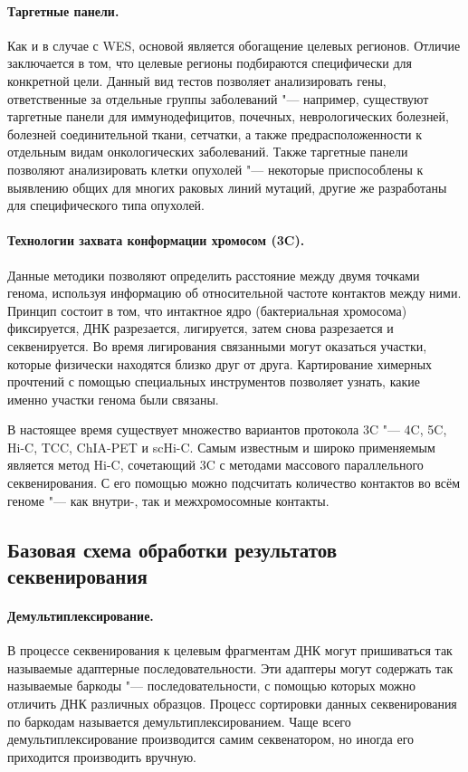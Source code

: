 \documentclass[a4paper,12pt]{article}
\begin{document}
\paragraph{Таргетные панели.}
Как и в случае с WES, основой является обогащение целевых регионов.
Отличие заключается в том, что целевые регионы подбираются специфически для конкретной цели.
Данный вид тестов позволяет анализировать гены, ответственные за отдельные группы заболеваний "--- например, существуют таргетные панели для иммунодефицитов, почечных, неврологических болезней, болезней соединительной ткани, сетчатки, а также предрасположенности к отдельным видам онкологических заболеваний.
Также таргетные панели позволяют анализировать клетки опухолей "--- некоторые приспособлены к выявлению общих для многих раковых линий мутаций, другие же разработаны для специфического типа опухолей\cite{yohe}.

\paragraph{Технологии захвата конформации хромосом (3C).}
Данные методики позволяют определить расстояние между двумя точками генома, используя информацию об относительной частоте контактов между ними.
Принцип состоит в том, что интактное ядро (бактериальная хромосома) фиксируется, ДНК разрезается, лигируется, затем снова разрезается и секвенируется.
Во время лигирования связанными могут оказаться участки, которые физически находятся близко друг от друга.
Картирование химерных прочтений с помощью специальных инструментов позволяет узнать, какие именно участки генома были связаны\cite{dekker}.

В настоящее время существует множество вариантов протокола 3C "--- 4C, 5C, Hi-C, TCC, ChIA-PET и scHi-C.
Самым известным и широко применяемым является метод Hi-C, сочетающий 3C с методами массового параллельного секвенирования.
С его помощью можно подсчитать количество контактов во всём геноме "--- как внутри-, так и межхромосомные контакты\cite{oluwadare}.

\subsection{Базовая схема обработки результатов секвенирования}

\paragraph{Демультиплексирование.}
В процессе секвенирования к целевым фрагментам ДНК могут пришиваться так называемые адаптерные последовательности.
Эти адаптеры могут содержать так называемые баркоды "--- последовательности, с помощью которых можно отличить ДНК различных образцов.
Процесс сортировки данных секвенирования по баркодам называется демультиплексированием.
Чаще всего демультиплексирование производится самим секвенатором, но иногда его приходится производить вручную.
\end{document}
